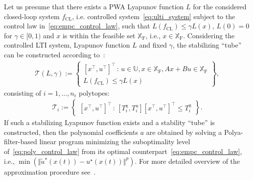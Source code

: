 \documentclass[letterpaper, 10 pt, conference]{ieeeconf}
\begin{document}
Let us presume that there exists a PWA Lyapunov function $L$ for the considered closed-loop system $f_{\mathrm{CL}}$, i.e. controlled system~\eqref{eq:ulti_system} subject to the control law in~\eqref{eq:empc_control_law}, such that $L(f_{\mathrm{CL}}) \le \gamma L(x)$, $L(0) = 0$ for $\gamma \in [0,1)$ and $x$ is within the feasible set $\mathbb{X}_{\mathrm{F}}$, i.e., $x \in \mathbb{X}_{\mathrm{F}}$. Considering the controlled LTI system, Lyapunov function $L$ and fixed $\gamma$, the stabilizing ``tube'' can be constructed according to~\cite{tube_FCh}:
\begin{eqnarray}
	\label{eq:stab_tube}
	\mathcal{T}(L, \gamma) := \begin{Bmatrix}
		[x^\top, u^\top]^\top \, : \, u \in \mathbb{U}, x \in \mathbb{X}_{\mathrm{F}} , A x + B u \in \mathbb{X}_{\mathrm{F}} \\
		L(f_{\mathrm{CL}}) \le \gamma L(x)
	\end{Bmatrix} \! , \nonumber 
\end{eqnarray}
consisting of $i = 1, \dots, n_\mathrm{r}$ polytopes:
\begin{eqnarray}
	\label{eq:stab_tube_polytope}
	\mathcal{T}_i := \begin{Bmatrix}
		[x^\top, u^\top]^\top \, : \, [T_i^{\mathrm{x}}, T_i^{\mathrm{u}}] [x^\top, u^\top]^\top \le T_i^0		
	\end{Bmatrix}. 
\end{eqnarray}
If such a stabilizing Lyapunov function exists and a stability ``tube'' is constructed, then the polynomial coefficients $a$ are obtained by solving a Polya-filter-based linear program minimizing the suboptimality level of~\eqref{eq:poly_control_law} from its optimal counterpart~\eqref{eq:empc_control_law}, i.e., $\min(\Vert\widetilde{u}^{\star}(x(t))-	u^{\star}(x(t))\Vert^{p})$. For more detailed overview of the approximation procedure see~\cite{kvasnica_polynomial}.

%
\end{document}

